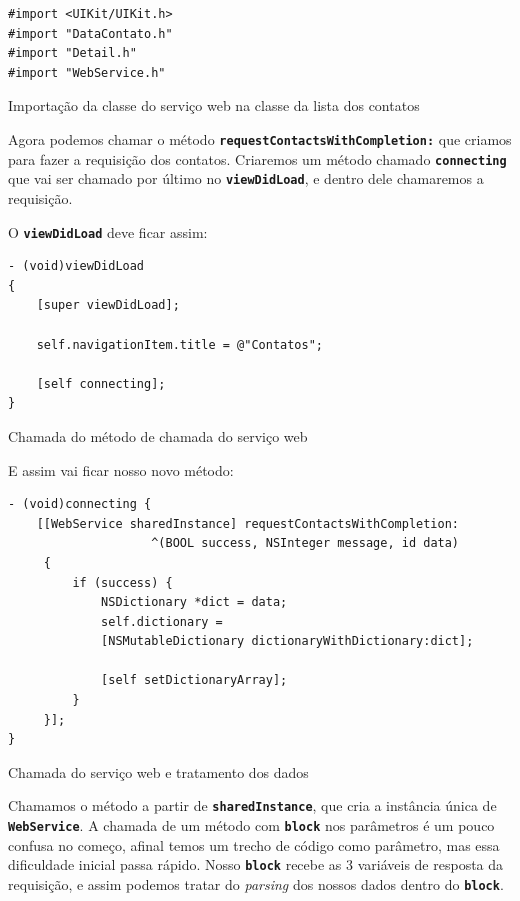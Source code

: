 \documentclass[a4paper,12pt,brazil,doubleside]{book}
\begin{document}
\begin{singlespace}
\begin{listing}[H]
\begin{verbatim}
#import <UIKit/UIKit.h>
#import "DataContato.h"
#import "Detail.h"
#import "WebService.h"
\end{verbatim}
\caption{Importação da classe do serviço web na classe da lista dos contatos}
\end{listing}


Agora podemos chamar o método \texttt{\textbf{requestContactsWithCompletion:}} que criamos para fazer a requisição dos contatos. Criaremos um método chamado \texttt{\textbf{connecting}} que vai ser chamado por último no \texttt{\textbf{viewDidLoad}}, e dentro dele chamaremos a requisição.

O \texttt{\textbf{viewDidLoad}} deve ficar assim:

\begin{listing}[H]
\begin{verbatim}
- (void)viewDidLoad
{
    [super viewDidLoad];

    self.navigationItem.title = @"Contatos";
    
    [self connecting];
}
\end{verbatim}
\caption{Chamada do método de chamada do serviço web}
\end{listing}


E assim vai ficar nosso novo método:

\begin{listing}[H]
\begin{verbatim}
- (void)connecting {
    [[WebService sharedInstance] requestContactsWithCompletion:
                    ^(BOOL success, NSInteger message, id data)
     {
         if (success) {
             NSDictionary *dict = data;
             self.dictionary = 
             [NSMutableDictionary dictionaryWithDictionary:dict];
             
             [self setDictionaryArray];
         }
     }];
}
\end{verbatim}
\caption{Chamada do serviço web e tratamento dos dados}
\end{listing}


Chamamos o método a partir de \texttt{\textbf{sharedInstance}}, que cria a instância única de\\ \texttt{\textbf{WebService}}. A chamada de um método com \texttt{\textbf{block}} nos parâmetros é um pouco confusa no começo, afinal temos um trecho de código como parâmetro, mas essa dificuldade inicial passa rápido. Nosso \texttt{\textbf{block}} recebe as 3 variáveis de resposta da requisição, e assim podemos tratar  do \emph{parsing} dos nossos dados dentro do \texttt{\textbf{block}}.


\end{singlespace}
\end{document}

